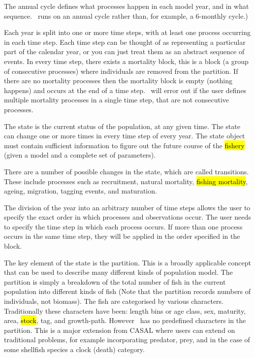 The annual cycle defines what processes happen in each model year, and in what sequence. \CNAME\ runs on an annual cycle rather than, for example, a 6-monthly cycle.) 

Each year is split into one or more time steps, with at least one process occurring in each time step. Each time step can be thought of as representing a particular part of the calendar year, or you can just treat them as an abstract sequence of events. In every time step, there exists a mortality block, this is a block (a group of consecutive processes) where individuals are removed from the partition. If there are no mortality processes then the mortality block is empty (nothing happens) and occurs at the end of a time step. \CNAME\ will error out if the user defines multiple mortality processes in a single time step, that are not consecutive processes.

The state is the current status of the population, at any given time. The state can change one or more times in every time step of every year. The state object must contain sufficient information to figure out the future course of the \hl{fishery} (given a model and a complete set of parameters).

There are a number of possible changes in the state, which are called transitions. These include processes such as recruitment, natural mortality, \hl{fishing mortality}, ageing, migration, tagging events, and maturation.

The division of the year into an arbitrary number of time steps allows the user to specify the exact order in which processes and observations occur. The user needs to specify the time step in which each process occurs. If more than one process occurs in the same time step, they will be applied in the order specified in the  block.

The key element of the state is the partition. This is a broadly applicable concept that can be used to describe many different kinds of population model. The partition is simply a breakdown of the total number of fish in the current population into different kinds of fish (Note that the partition records numbers of individuals, not biomass). The fish are categorised by various characters. Traditionally these characters have been: length bins or age class, sex, maturity, area, \hl{stock}, tag, and growth-path. However \CNAME\ has no predefined characters in the partition. This is a major extension from CASAL where users can extend on traditional problems, for example incorporating predator, prey, and in the case of some shellfish species a clock (death) category.


